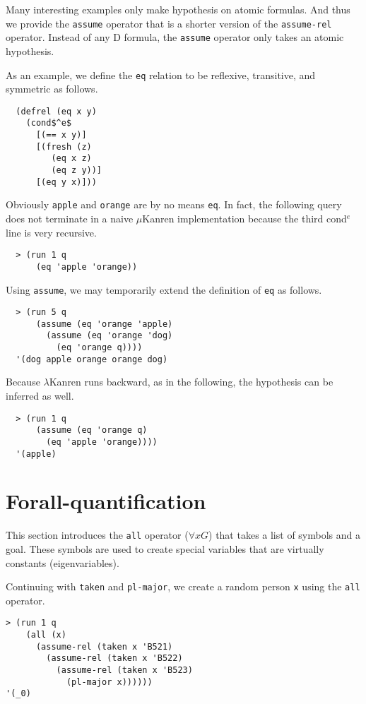 \documentclass[acmlarge,review]{acmart}
\theoremstyle{definition}
\begin{document}
Many interesting examples only make hypothesis on atomic formulas. And thus we
provide the \texttt{assume} operator that is a shorter version of the
\texttt{assume-rel} operator. Instead of any D formula, the \texttt{assume}
operator only takes an atomic hypothesis.

As an example, we define the \texttt{eq} relation to be reflexive, transitive,
and symmetric as follows.
\begin{lstlisting}
  (defrel (eq x y)
    (cond$^e$
      [(== x y)]
      [(fresh (z)
         (eq x z)
         (eq z y))]
      [(eq y x)]))
\end{lstlisting}
Obviously \texttt{apple} and \texttt{orange} are by no means \texttt{eq}. 
In fact, the following query does not terminate in a naive $\mu$Kanren
implementation because the third cond$^e$ line is very recursive.
\begin{lstlisting}
  > (run 1 q
      (eq 'apple 'orange))
\end{lstlisting}

\clearpage

Using \texttt{assume}, we may temporarily extend the definition of
\texttt{eq} as follows.
\begin{lstlisting}
  > (run 5 q
      (assume (eq 'orange 'apple)
        (assume (eq 'orange 'dog)  
          (eq 'orange q))))
  '(dog apple orange orange dog)
\end{lstlisting}

Because $\lambda$Kanren runs backward, as in the following,
the hypothesis can be inferred as well.
\begin{lstlisting}
  > (run 1 q
      (assume (eq 'orange q)
        (eq 'apple 'orange))))
  '(apple)
\end{lstlisting}

\section{Forall-quantification}
This section introduces the \texttt{all} operator ($\forall x G$) that takes
a list of symbols and a goal. These symbols are used to create special
variables that are virtually constants (eigenvariables).

Continuing with \texttt{taken} and \texttt{pl-major},
we create a random person \texttt{x} using the \texttt{all} operator.
\begin{lstlisting}
> (run 1 q
    (all (x)
      (assume-rel (taken x 'B521)
        (assume-rel (taken x 'B522)
          (assume-rel (taken x 'B523)
            (pl-major x))))))
'(_0)
\end{lstlisting}
\end{document}
